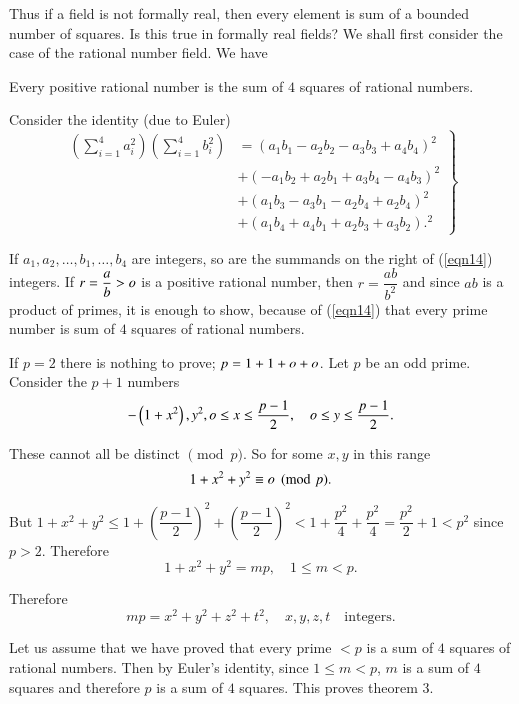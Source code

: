 Thus if a field is not formally real, then every element is sum of a
bounded number of squares. Is this true in formally real fields? We
shall first consider the case of the rational number field. We have


\begin{thm}\label{thm3}
Every positive rational number is the sum of $4$ squares of rational numbers.
\end{thm}


\begin{Proof}
Consider the identity (due to Euler)
\begin{equation}\label{eqn14}
\left.\begin{aligned}
\left(\sum\limits_{i=1}^{4} a^{2}_i\right) \left(\sum\limits_{i=1}^{4}
b^{2}_i\right) &= (a_1b_1-a_2b_2-a_3b_3+a_4b_4)^{2}\\
                 &+(-a_1b_2+a_2b_1+a_3b_4-a_4b_3)^{2}\\
                 &+(a_1b_3-a_3b_1-a_2b_4+a_2b_4)^{2}\\
                 &+(a_1b_4+a_4b_1+a_2b_3+a_3b_2).^{2}
\end{aligned}\right\}
\end{equation}

If $a_1, a_2,\ldots, b_1,\ldots,b_4$ are integers, so are the summands
on the right of (\ref{eqn14}) integers. If $r=\dfrac{a}{b}>o$ is a
positive rational number, then $r=\dfrac{ab}{b^{2}}$ and since $ab$ is
a product of primes, it is enough to show, because of (\ref{eqn14})
that every prime number is sum of $4$ squares of rational numbers.

If $p=2$ there is nothing to prove; $p=1+1+o+o$. Let $p$ be an odd
prime. Consider the $p+1$ numbers
$$
-\left(1+x^{2}\right), y^{2}, o \leq x\leq \dfrac{p-1}{2}, \quad o \leq y\leq \dfrac{p-1}{2}.
$$

These cannot all be distinct $\pmod p$. So for some $x,y$ in this range
$$
1+x^{2}+y^{2}\equiv o \pmod p.
$$

But $1+x^{2}+y^{2}\leq
1+\left(\dfrac{p-1}{2}\right)^{2}+\left(\dfrac{p-1}{2}\right)^{2} <
1+\dfrac{p^{2}}{4}+\dfrac{p^{2}}{4}=\dfrac{p^{2}}{2}+1<p^{2}$ since
$p>2$. Therefore
$$
1+x^{2}+y^{2}=mp, \quad 1\leq m<p.
$$ 

Therefore
$$
mp=x^{2}+y^{2}+z^{2}+t^{2}, \quad x,y,z,t\quad \text{integers.}
$$

Let us assume that we have proved that every prime $<p$ is a sum of
$4$ squares of rational numbers. Then by Euler's identity, since
$1\leq m<p$, $m$ is a sum of $4$ squares and therefore $p$ is a sum of
$4$ squares. This proves theorem $3$.
\enprf
\end{Proof}


